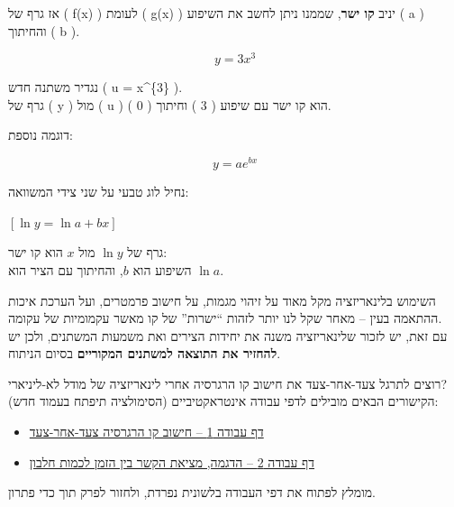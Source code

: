 \documentclass[
  hebrew,
  letterpaper,
  DIV=11,
  numbers=noendperiod]{scrreprt}
\providecommand{\tightlist}{%
  \setlength{\itemsep}{0pt}\setlength{\parskip}{0pt}}
\begin{document}
אז גרף של ( f(x) ) לעומת ( g(x) ) יניב \textbf{קו ישר}, שממנו ניתן לחשב
את השיפוע ( a ) והחיתוך ( b ).

\[
y = 3x^{3}
\]

נגדיר משתנה חדש ( u = x\^{}\{3\} ).\\
גרף של ( y ) מול ( u ) הוא קו ישר עם שיפוע ( 3 ) וחיתוך ( 0 ).

דוגמה נוספת:

\[
y = a e^{bx}
\]

נחיל לוג טבעי על שני צידי המשוואה:

\([\ln y = \ln a + b x]\)

גרף של \(\ln y\) מול \(x\) הוא קו ישר:\\
השיפוע הוא \(b\), והחיתוך עם הציר הוא \(\ln a\).

{השימוש בלינאריזציה מקל מאוד על זיהוי מגמות, על חישוב פרמטרים, ועל הערכת
איכות ההתאמה בעין -- מאחר שקל לנו יותר לזהות ``ישרות'' של קו מאשר
עקמומיות של עקומה}.\\
{עם זאת, יש לזכור שלינאריזציה משנה את יחידות הצירים ואת משמעות המשתנים,
ולכן יש \textbf{להחזיר את התוצאה למשתנים המקוריים} בסיום הניתוח}.

\begin{tcolorbox}[enhanced jigsaw, colback=white, arc=.35mm, coltitle=black, breakable, toptitle=1mm, leftrule=.75mm, colbacktitle=quarto-callout-tip-color!10!white, opacitybacktitle=0.6, bottomtitle=1mm, titlerule=0mm, opacityback=0, colframe=quarto-callout-tip-color-frame, title=\textcolor{quarto-callout-tip-color}{\faLightbulb}\hspace{0.5em}{טיפ: דפי עבודה אינטראקטיביים לריבועים המינימליים}, rightrule=.15mm, bottomrule=.15mm, toprule=.15mm, left=2mm]

רוצים לתרגל צעד-אחר-צעד את חישוב קו הרגרסיה אחרי לינאריזציה של מודל
לא-ליניארי?\\
הקישורים הבאים מובילים לדפי עבודה אינטראקטיביים (הסימולציה תיפתח בעמוד
חדש):

\begin{itemize}
\tightlist
\item
  \href{simulations/LeastSquaresCalc.html}{דף עבודה 1 -- חישוב קו
  הרגרסיה צעד-אחר-צעד}
\item
  \href{simulations/LeastSquaresCalc2.html}{דף עבודה 2 -- הדגמה, מציאת
  הקשר בין הזמן לכמות חלבון}
\end{itemize}

מומלץ לפתוח את דפי העבודה בלשונית נפרדת, ולחזור לפרק תוך כדי פתרון.

\end{tcolorbox}
\end{document}
